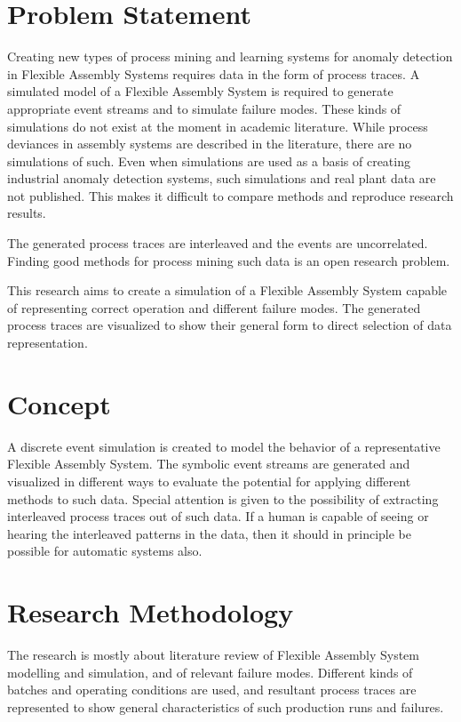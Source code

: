 \documentclass[a4paper,10pt]{article}
\begin{document}
\section{Problem Statement}

Creating new types of process mining and learning systems for anomaly detection in Flexible Assembly Systems requires data in the form of process traces.
A simulated model of a Flexible Assembly System is required to generate appropriate event streams and to simulate failure modes. These kinds of simulations
do not exist at the moment in academic literature. While process deviances in assembly systems are described in the literature, there are no simulations of such.
Even when simulations are used as a basis of creating industrial anomaly detection systems, such simulations and real plant data are not published\cite{matarese2013procedure}.
This makes it difficult to compare methods and reproduce research results.

The generated process traces are interleaved and the events are uncorrelated. Finding good methods for process mining such data is an open research problem.

This research aims to create a simulation of a Flexible Assembly System capable of representing correct operation and different failure modes.
The generated process traces are visualized to show their general form to direct selection of data representation.

\section{Concept}

A discrete event simulation is created to model the behavior of a representative Flexible Assembly System. The symbolic event streams are generated and visualized in different ways
to evaluate the potential for applying different methods to such data. Special attention is given to the possibility of extracting interleaved process traces out of such data.
If a human is capable of seeing or hearing the interleaved patterns in the data, then it should in principle be possible for automatic systems also.

\section{Research Methodology}

The research is mostly about literature review of Flexible Assembly System modelling and simulation, and of relevant failure modes.
Different kinds of batches and operating conditions are used, and resultant process traces are represented to show general characteristics of such production runs and failures.
\end{document}
